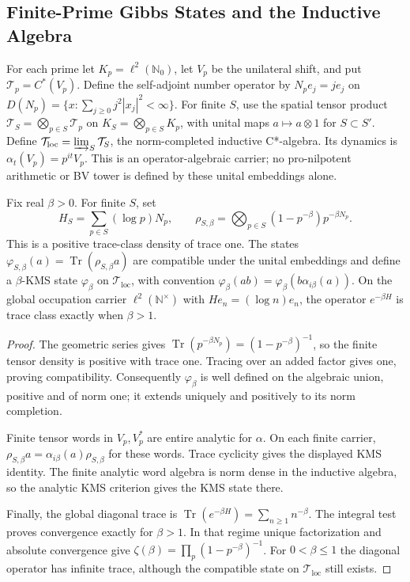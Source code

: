 \subsection{Finite-Prime Gibbs States and the Inductive Algebra}
\begin{definition}
\label{v4-arith:pos-costello:def:pro-nilpotent}
For each prime let \(K_p=\ell^2(\mathbb N_0)\), let \(V_p\) be
the unilateral shift, and put \(\mathcal T_p=C^*(V_p)\).
Define the self-adjoint number operator by \(N_pe_j=je_j\) on
\(D(N_p)=\{x:\sum_{j\geq0}j^2|x_j|^2<\infty\}\).
For finite \(S\), use the spatial tensor product
\(\mathcal T_S=\bigotimes_{p\in S}\mathcal T_p\) on
\(K_S=\bigotimes_{p\in S}K_p\), with unital maps
\(a\mapsto a\otimes1\) for \(S\subset S'\). Define
\(\mathcal T_{\mathrm{loc}}=\varinjlim_S\mathcal T_S\), the
norm-completed inductive C*-algebra. Its dynamics is
\(\alpha_t(V_p)=p^{it}V_p\). This is an operator-algebraic
carrier; no pro-nilpotent arithmetic or BV tower is defined by
these unital embeddings alone.
\end{definition}
\begin{proposition}
\label{v4-arith:pos-costello:prop:pro-nilpotent-convergence}
Fix real \(\beta>0\). For finite \(S\), set
\[
 H_S=\sum_{p\in S}(\log p)N_p,\qquad
 \rho_{S,\beta}=\bigotimes_{p\in S}
       (1-p^{-\beta})p^{-\beta N_p}.
\]
This is a positive trace-class density of trace one. The states
\(\varphi_{S,\beta}(a)=\operatorname{Tr}(\rho_{S,\beta}a)\)
are compatible under the unital embeddings and define a
\(\beta\)-KMS state \(\varphi_\beta\) on
\(\mathcal T_{\mathrm{loc}}\), with convention
\(\varphi_\beta(ab)=\varphi_\beta(b\alpha_{i\beta}(a))\).
On the global occupation carrier \(\ell^2(\mathbb N^\times)\)
with \(H e_n=(\log n)e_n\), the operator \(e^{-\beta H}\)
is trace class exactly when \(\beta>1\).
\end{proposition}
\begin{proof}
The geometric series gives
\(\operatorname{Tr}(p^{-\beta N_p})=(1-p^{-\beta})^{-1}\),
so the finite tensor density is positive with trace one.
Tracing over an added factor gives one, proving compatibility.
Consequently \(\varphi_\beta\) is well defined on the algebraic
union, positive and of norm one; it extends uniquely and positively
to its norm completion.

Finite tensor words in \(V_p,V_p^*\) are entire analytic for
\(\alpha\). On each finite carrier,
\(\rho_{S,\beta}a=\alpha_{i\beta}(a)\rho_{S,\beta}\)
for these words. Trace cyclicity gives the displayed KMS identity.
The finite analytic word algebra is norm dense in the inductive
algebra, so the analytic KMS criterion gives the KMS state there.

Finally, the global diagonal trace is
\(\operatorname{Tr}(e^{-\beta H})=\sum_{n\geq1}n^{-\beta}\).
The integral test proves convergence exactly for \(\beta>1\).
In that regime unique factorization and absolute convergence give
\(\zeta(\beta)=\prod_p(1-p^{-\beta})^{-1}\).
For \(0<\beta\leq1\) the diagonal operator has infinite trace,
although the compatible state on \(\mathcal T_{\mathrm{loc}}\)
still exists.
\end{proof}
